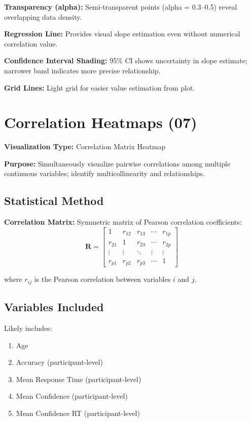 \documentclass[12pt,a4paper]{article}
\begin{document}
\textbf{Transparency (alpha):} Semi-transparent points (alpha = 0.3--0.5) reveal overlapping data density.

\textbf{Regression Line:} Provides visual slope estimation even without numerical correlation value.

\textbf{Confidence Interval Shading:} 95\% CI shows uncertainty in slope estimate; narrower band indicates more precise relationship.

\textbf{Grid Lines:} Light grid for easier value estimation from plot.

\newpage
\section{Correlation Heatmaps (07)}

\textbf{Visualization Type:} Correlation Matrix Heatmap

\textbf{Purpose:} Simultaneously visualize pairwise correlations among multiple continuous variables; identify multicollinearity and relationships.

\subsection{Statistical Method}

\textbf{Correlation Matrix:} Symmetric matrix of Pearson correlation coefficients:
\begin{equation}
\mathbf{R} = \begin{bmatrix}
1 & r_{12} & r_{13} & \cdots & r_{1p} \\
r_{21} & 1 & r_{23} & \cdots & r_{2p} \\
\vdots & \vdots & \ddots & \vdots & \vdots \\
r_{p1} & r_{p2} & r_{p3} & \cdots & 1
\end{bmatrix}
\end{equation}

where $r_{ij}$ is the Pearson correlation between variables $i$ and $j$.

\subsection{Variables Included}

Likely includes:
\begin{enumerate}
    \item Age
    \item Accuracy (participant-level)
    \item Mean Response Time (participant-level)
    \item Mean Confidence (participant-level)
    \item Mean Confidence RT (participant-level)
\end{enumerate}
\end{document}
